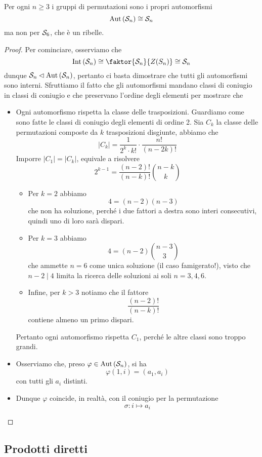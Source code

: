 \begin{multicols}{2}
\begin{theorem}
	Per ogni $ n \geq 3 $ i gruppi di permutazioni sono i propri automorfismi $$  \Aut{\S_n} \cong \S_n  $$ ma non per $ \S_6 $, che è un ribelle.
\end{theorem}
\begin{proof}
	Per cominciare, osserviamo che
	\[ \Int{\S_n} \cong \faktor{\S_n}{Z(S_n)} \cong \S_n \]
	dunque $ \S_n \lhd \Aut{\S_n} $, pertanto ci basta dimostrare che tutti gli automorfismi sono interni. Sfruttiamo il fatto che gli automorfismi mandano classi di coniugio in classi di coniugio e che preservano l'ordine degli elementi per mostrare che
	\begin{itemize}
		\item  Ogni automorfismo rispetta la classe delle trasposizioni. Guardiamo come sono fatte le classi di coniugio degli elementi di ordine 2. Sia $ C_k $ la classe delle permutazioni composte da $ k $ trasposizioni disgiunte, abbiamo che
		\[ |C_k|  = \frac{1}{2^k \cdot k!}\cdot \frac{n!}{(n-2k)!} \]
		Imporre $ |C_1| = |C_k| $, equivale a risolvere
		\[ 2^{k-1} = \frac{(n-2)!}{(n-k)!}{n-k \choose k } \]
		\begin{itemize}
			\item Per $ \boxed{k = 2} $ abbiamo
			\[ 4 = (n-2)(n-3) \]
			che non ha soluzione, perché i due fattori a destra sono interi consecutivi, quindi uno di loro sarà dispari.
			\item Per $ \boxed{k = 3} $ abbiamo
			\[ 4 = (n-2) {n-3 \choose 3} \]
			che ammette $ n = 6 $ come unica soluzione (il caso famigerato!), visto che $ n-2 \mid 4 $ limita la ricerca delle soluzioni ai soli $ n = 3, 4, 6 $.
			\item Infine, per $ \boxed{k > 3} $ notiamo che il fattore 
			\[ \frac{(n-2)!}{(n-k)!} \]
			contiene almeno un primo dispari.
		\end{itemize}
		Pertanto ogni automorfismo rispetta $ C_1 $, perché le altre classi sono troppo grandi. 
		\item Osserviamo che, preso $ \varphi \in \Aut{\S_n} $, si ha
		$$  \varphi(1, i) = (a_1, a_i)  $$
		con tutti gli $ a_i $ distinti.
		\item Dunque $ \varphi $ coincide, in realtà, con il coniugio per la permutazione
		$$  \sigma : i \mapsto a_i  $$
	\end{itemize}
\end{proof}

\end{multicols}
\subsection{Prodotti diretti}

